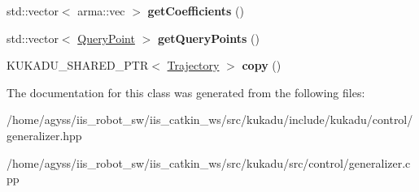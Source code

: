 \begin{DoxyCompactItemize}
\item 
std\+::vector$<$ arma\+::vec $>$ {\bfseries get\+Coefficients} ()\hypertarget{classkukadu_1_1DictionaryTrajectory_ab118502bdf3cb95cc52f7dc640572deb}{}\label{classkukadu_1_1DictionaryTrajectory_ab118502bdf3cb95cc52f7dc640572deb}

\item 
std\+::vector$<$ \hyperlink{classkukadu_1_1QueryPoint}{Query\+Point} $>$ {\bfseries get\+Query\+Points} ()\hypertarget{classkukadu_1_1DictionaryTrajectory_a4d1fd2fcff1e7a696976a2b50bdb1a9a}{}\label{classkukadu_1_1DictionaryTrajectory_a4d1fd2fcff1e7a696976a2b50bdb1a9a}

\item 
K\+U\+K\+A\+D\+U\+\_\+\+S\+H\+A\+R\+E\+D\+\_\+\+P\+TR$<$ \hyperlink{classkukadu_1_1Trajectory}{Trajectory} $>$ {\bfseries copy} ()\hypertarget{classkukadu_1_1DictionaryTrajectory_a4bdb28bd8c9bb18572f8b1d78c683d02}{}\label{classkukadu_1_1DictionaryTrajectory_a4bdb28bd8c9bb18572f8b1d78c683d02}

\end{DoxyCompactItemize}


The documentation for this class was generated from the following files\+:\begin{DoxyCompactItemize}
\item 
/home/agyss/iis\+\_\+robot\+\_\+sw/iis\+\_\+catkin\+\_\+ws/src/kukadu/include/kukadu/control/generalizer.\+hpp\item 
/home/agyss/iis\+\_\+robot\+\_\+sw/iis\+\_\+catkin\+\_\+ws/src/kukadu/src/control/generalizer.\+cpp\end{DoxyCompactItemize}
